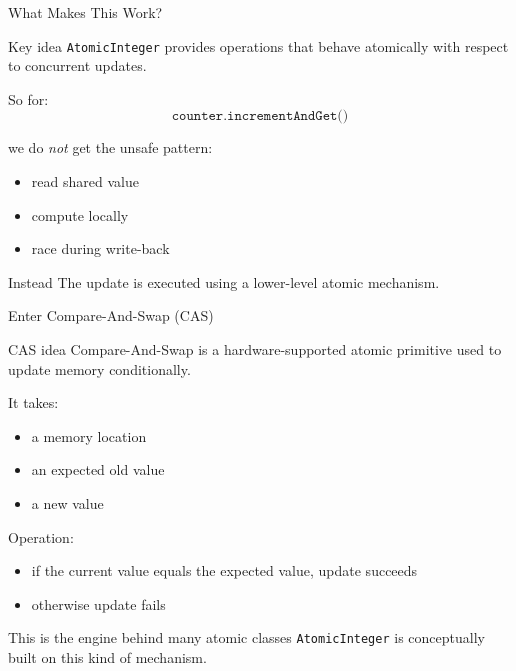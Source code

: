 \documentclass[aspectratio=169,11pt]{beamer}
\begin{document}
	\begin{frame}{What Makes This Work?}
		\begin{block}{Key idea}
			\texttt{AtomicInteger} provides operations that behave atomically with respect to concurrent updates.
		\end{block}
		
		\vspace{0.3cm}
		
		So for:
		\[
		\texttt{counter.incrementAndGet()}
		\]
		
		we do \emph{not} get the unsafe pattern:
		
		\begin{itemize}
			\item read shared value
			\item compute locally
			\item race during write-back
		\end{itemize}
		
		\vspace{0.3cm}
		
		\begin{exampleblock}{Instead}
			The update is executed using a lower-level atomic mechanism.
		\end{exampleblock}
	\end{frame}
	
	\begin{frame}{Enter Compare-And-Swap (CAS)}
		\begin{block}{CAS idea}
			Compare-And-Swap is a hardware-supported atomic primitive used to update memory conditionally.
		\end{block}
		
		\vspace{0.3cm}
		
		It takes:
		\begin{itemize}
			\item a memory location
			\item an expected old value
			\item a new value
		\end{itemize}
		
		\vspace{0.3cm}
		
		Operation:
		\begin{itemize}
			\item if the current value equals the expected value, update succeeds
			\item otherwise update fails
		\end{itemize}
		
		\vspace{0.3cm}
		
		\begin{exampleblock}{This is the engine behind many atomic classes}
			\texttt{AtomicInteger} is conceptually built on this kind of mechanism.
		\end{exampleblock}
	\end{frame}
	
\end{document}
